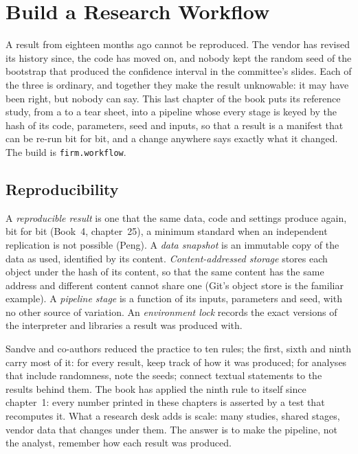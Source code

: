 \chapter{Build a Research Workflow}\label{ch:rs:build-a-research-workflow}

A result from eighteen months ago cannot be reproduced. The vendor has revised its history since, the code has moved on, and nobody kept the random seed of the
bootstrap that produced the confidence interval in the committee's slides. Each of the three is ordinary, and together they make the result unknowable: it may
have been right, but nobody can say. This last chapter of the book puts its reference study, from a  to a tear sheet, into a pipeline whose every
stage is keyed by the hash of its code, parameters, seed and inputs, so that a result is a manifest that can be re-run bit for bit, and a change anywhere says
exactly what it changed. The build is \texttt{firm.workflow}.

\section{Reproducibility}

\begin{definition}\label{def:rs:build-a-research-workflow:repro}
A \emph{reproducible result} is one that the same data, code and settings produce again, bit for bit (Book~4, chapter~25), a minimum
standard when an independent replication is not possible (Peng). A \emph{data snapshot} is an immutable copy of the data as used, identified
by its content. \emph{Content-addressed storage} stores each object under the hash of its content, so that the same content has the
same address and different content cannot share one (Git's object store is the familiar example). A \emph{pipeline stage} is a function of its
inputs, parameters and seed, with no other source of variation. An \emph{environment lock} records the exact versions of the interpreter
and libraries a result was produced with.
\end{definition}

Sandve and co-authors reduced the practice to ten rules; the first, sixth and ninth carry most of it: for every result, keep track of how it was produced; for
analyses that include randomness, note the seeds; connect textual statements to the results behind them. The book has applied the ninth rule to itself since
chapter~1: every number printed in these chapters is asserted by a test that recomputes it. What a research desk adds is scale: many studies, shared stages,
vendor data that changes under them. The answer is to make the pipeline, not the analyst, remember how each result was produced.

